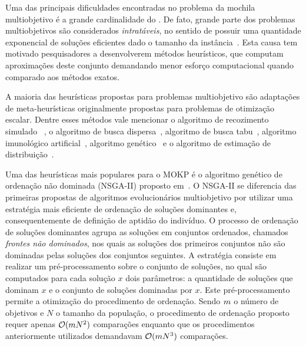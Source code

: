 Uma das principais dificuldades encontradas no problema da mochila multiobjetivo
é a grande cardinalidade do \paretoset{}.
De fato, grande parte dos problemas multiobjetivos são considerados \emph{intratáveis},
no sentido de possuir uma quantidade exponencial de soluções eficientes
dado o tamanho da instância~\cite{ehrgott2013multicriteria}.
Esta causa tem motivado pesquisadores
a desenvolverem métodos heurísticos, que computam aproximações deste conjunto
demandando menor esforço computacional quando comparado aos métodos exatos.

A maioria das heurísticas propostas para problemas multiobjetivo
são adaptações de meta-heurísticas originalmente propostas para
problemas de otimização escalar.
Dentre esses métodos vale mencionar o algoritmo de recozimento simulado
~\cite{czyzzak1998pareto},
o algoritmo de busca dispersa~\cite{da2006scatter,da2007integrating},
algoritmo de busca tabu~\cite{gandibleux2000tabu},
algoritmo imunológico artificial~\cite{gao2014quantum},
algoritmo genético~\cite{abdelaziz1999hybrid}
e o algoritmo de estimação de distribuição~\cite{martins2017hybrid}.

Uma das heurísticas mais populares para o MOKP é o algoritmo genético
de ordenação não dominada (NSGA-II) proposto em~\cite{deb2002fast}.
O NSGA-II se diferencia das primeiras propostas de algoritmos evolucionários
multiobjetivo por utilizar uma estratégia mais eficiente
de ordenação de soluções dominantes e, consequentemente de
definição de aptidão do indivíduo.
O processo de ordenação de soluções dominantes agrupa as soluções
em conjuntos ordenados, chamados \emph{frontes não dominados},
nos quais as soluções dos primeiros conjuntos não são dominadas pelas soluções dos conjuntos seguintes.
A estratégia consiste em realizar um pré-processamento sobre o conjunto de
soluções, no qual são computados para cada solução $x$ dois parâmetros: a quantidade de soluções
que dominam $x$ e o conjunto de soluções dominadas por $x$.
Este pré-processamento permite a otimização do procedimento de ordenação.
Sendo $m{}$ o número de objetivos e $N$ o tamanho da população,
o procedimento de ordenação proposto requer apenas $\mathcal{O}(m{}N^2)$ comparações
enquanto que os procedimentos anteriormente utilizados demandavam $\mathcal{O}(m{}N^3)$ comparações.

